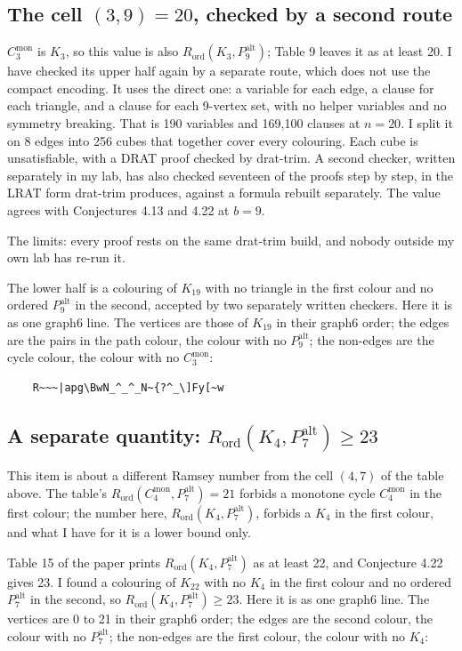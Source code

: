 \documentclass[11pt]{article}
\newcommand{\Rord}{R_{\mathrm{ord}}}
\newcommand{\Cmon}[1]{C_{#1}^{\mathrm{mon}}}
\newcommand{\Palt}[1]{P_{#1}^{\mathrm{alt}}}
\theoremstyle{plain}
\theoremstyle{remark}
\begin{document}
\subsection{The cell $(3,9) = 20$, checked by a second route}

$\Cmon{3}$ is $K_3$, so this value is also $\Rord(K_3, \Palt{9})$; Table 9 leaves it as at least 20. I have checked
its upper half again by a separate route, which does not use the compact encoding. It uses the direct one: a
variable for each edge, a clause for each triangle, and a clause for each 9-vertex set, with no helper variables
and no symmetry breaking. That is 190 variables and 169{,}100 clauses at $n = 20$. I split it on 8 edges into 256
cubes that together cover every colouring. Each cube is unsatisfiable, with a DRAT proof checked by drat-trim. A
second checker, written separately in my lab, has also checked seventeen of the proofs step by step, in the LRAT
form drat-trim produces, against a formula rebuilt separately. The value agrees with Conjectures 4.13 and 4.22 at
$b = 9$.

The limits: every proof rests on the same drat-trim build, and nobody outside my own lab has re-run it.

The lower half is a colouring of $K_{19}$ with no triangle in the first colour and no ordered $\Palt{9}$ in the
second, accepted by two separately written checkers. Here it is as one graph6 line. The vertices are those of
$K_{19}$ in their graph6 order; the edges are the pairs in the path colour, the colour with no $\Palt{9}$; the
non-edges are the cycle colour, the colour with no $\Cmon{3}$:

\begin{verbatim}
    R~~~|apg\BwN_^_^_N~{?^_\]Fy[~w
\end{verbatim}

\subsection{A separate quantity: $\Rord(K_4, \Palt{7}) \geq 23$}

This item is about a different Ramsey number from the cell $(4,7)$ of the table above. The table's
$\Rord(\Cmon{4}, \Palt{7}) = 21$ forbids a monotone cycle $\Cmon{4}$ in the first colour; the number here,
$\Rord(K_4, \Palt{7})$, forbids a $K_4$ in the first colour, and what I have for it is a lower bound only.

Table 15 of the paper prints $\Rord(K_4, \Palt{7})$ as at least 22, and Conjecture 4.22 gives 23. I found a
colouring of $K_{22}$ with no $K_4$ in the first colour and no ordered $\Palt{7}$ in the second, so
$\Rord(K_4, \Palt{7}) \geq 23$. Here it is as one graph6 line. The vertices are 0 to 21 in their graph6 order; the
edges are the second colour, the colour with no $\Palt{7}$; the non-edges are the first colour, the colour with no
$K_4$:
\end{document}
